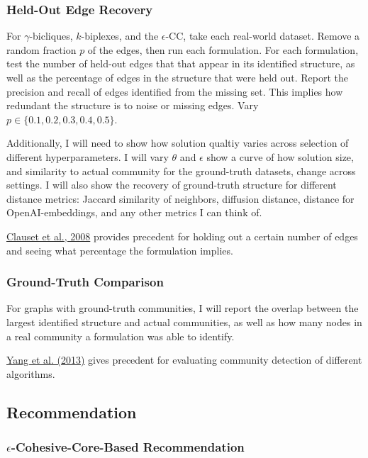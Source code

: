 \documentclass{article}
\begin{document}
\subsubsection{Held-Out Edge Recovery}

For $\gamma$-bicliques, $k$-biplexes, and the $\epsilon$-CC, take each real-world dataset. Remove a random fraction $p$ of the edges, then run each formulation. For each formulation, test the number of held-out edges that that appear in its identified structure, as well as the percentage of edges in the structure that were held out. Report the precision and recall of edges identified from the missing set. This implies how redundant the structure is to noise or missing edges. Vary $p \in \{0.1, 0.2, 0.3, 0.4, 0.5\}$.

Additionally, I will need to show how solution qualtiy varies across selection of different hyperparameters. I will vary $\theta$ and $\epsilon$ show a curve of how solution size, and similarity to actual community for the ground-truth datasets, change across settings. I will also show the recovery of ground-truth structure for different distance metrics: Jaccard similarity of neighbors, diffusion distance, distance for OpenAI-embeddings, and any other metrics I can think of.

\href{https://www.nature.com/articles/nature06830}{Clauset et al., 2008} provides precedent for holding out a certain number of edges and seeing what percentage the formulation implies.

\subsubsection{Ground-Truth Comparison}

For graphs with ground-truth communities, I will report the overlap between the largest identified structure and actual communities, as well as how many nodes in a real community a formulation was able to identify.

\href{https://link.springer.com/article/10.1007/s10115-013-0693-z}{Yang et al. (2013)} gives precedent for evaluating community detection of different algorithms.

\subsection{Recommendation}

\subsubsection{$\epsilon$-Cohesive-Core-Based Recommendation}
\end{document}
